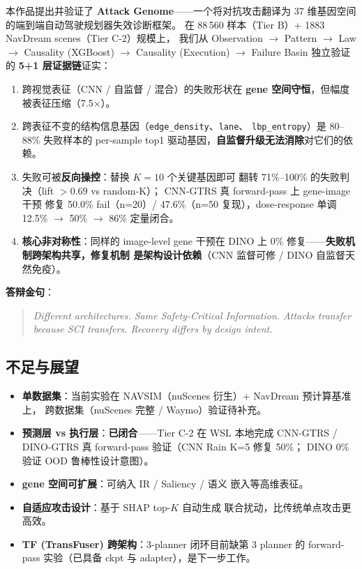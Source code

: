 \documentclass[a4paper,12pt,fontset=fandol]{ctexart}
\newcommand{\gene}[1]{\texttt{#1}}
\begin{document}
{本作品提出并验证了 \textbf{Attack Genome}——一个将对抗攻击翻译为
37 维基因空间的端到端自动驾驶规划器失效诊断框架。
在 88\,560 样本（Tier B）+ 1883 NavDream scenes（Tier C-2）规模上，
我们从 Observation $\to$ Pattern $\to$ Law $\to$ Causality (XGBoost)
$\to$ Causality (Execution) $\to$ Failure Basin 独立验证的
\textbf{5+1 层证据链}证实：

\begin{enumerate}[leftmargin=*]
\item 跨视觉表征（CNN / 自监督 / 混合）的失败形状在
      \textbf{gene 空间守恒}，但幅度被表征压缩（7.5$\times$）。
\item 跨表征不变的结构信息基因（\gene{edge\_density}、\gene{lane}、
      \gene{lbp\_entropy}）是 $80$–$88\%$ 失败样本的 per-sample
      top1 驱动基因，\textbf{自监督升级无法消除}对它们的依赖。
\item 失败可被\textbf{反向操控}：替换 $K\!=\!10$ 个关键基因即可
      翻转 71\%–100\% 的失败判决（lift $> 0.69$ vs random-K）；
      CNN-GTRS 真 forward-pass 上 gene-image 干预
      修复 50.0\% fail（n=20）/ 47.6\%（n=50 复现），dose-response 单调
      12.5\% $\to$ 50\% $\to$ 86\% 定量闭合。
\item \textbf{核心非对称性}：同样的 image-level gene 干预在
      DINO 上 0\% 修复——\textbf{失败机制跨架构共享，修复机制
      是架构设计依赖}（CNN 监督可修 / DINO 自监督天然免疫）。
\end{enumerate}

\noindent\textbf{答辩金句}：
\begin{quote}
\textit{Different architectures. Same Safety-Critical Information.
Attacks transfer because SCI transfers. Recovery differs by design intent.}
\end{quote}

\subsection{不足与展望}

\begin{itemize}
\item \textbf{单数据集}：当前实验在 NAVSIM（nuScenes 衍生）+ NavDream 预计算基准上，
      跨数据集（nuScenes 完整 / Waymo）验证待补充。
\item \textbf{预测层 vs 执行层}：\textbf{已闭合}——Tier C-2 在 WSL 本地完成
      CNN-GTRS / DINO-GTRS 真 forward-pass 验证（CNN Rain K=5 修复 50\%；
      DINO 0\% 验证 OOD 鲁棒性设计意图）。
\item \textbf{gene 空间可扩展}：可纳入 IR / Saliency / 语义
      嵌入等高维表征。
\item \textbf{自适应攻击设计}：基于 SHAP top-$K$ 自动生成
      联合扰动，比传统单点攻击更高效。
\item \textbf{TF (TransFuser) 跨架构}：3-planner 闭环目前缺第 3 planner
      的 forward-pass 实验（已具备 ckpt 与 adapter），是下一步工作。
\end{itemize}

}
\end{document}
